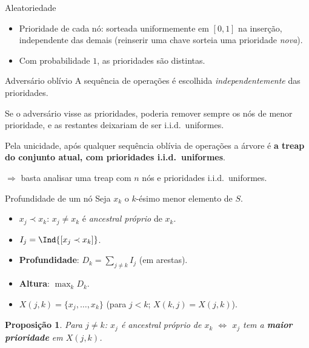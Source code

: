 \documentclass[aspectratio=169,11pt]{beamer}
\newtheorem{proposicao}[theorem]{Proposição}
\theoremstyle{definition}
\begin{document}
\begin{frame}{Aleatoriedade}
  \begin{itemize}
  \item Prioridade de cada nó: sorteada uniformemente em $[0,1]$ na
    inserção, independente das demais (reinserir uma chave sorteia
    uma prioridade \emph{nova}).
  \item Com probabilidade $1$, as prioridades são distintas.
  \end{itemize}
  \pause
  \begin{alertblock}{Adversário oblívio}
    A sequência de operações é escolhida \emph{independentemente} das
    prioridades.

    Se o adversário visse as prioridades, poderia remover sempre os nós
    de menor prioridade, e as restantes deixariam de ser i.i.d.\
    uniformes.
  \end{alertblock}
  \pause
  Pela unicidade, após qualquer sequência oblívia de operações a
  árvore é \textbf{a treap do conjunto atual, com prioridades i.i.d.\
    uniformes}.

  $\Rightarrow$ basta analisar uma treap com $n$ nós e prioridades
  i.i.d.\ uniformes.
\end{frame}

\begin{frame}{Profundidade de um nó}
  Seja $x_k$ o $k$-ésimo menor elemento de $S$.
  \begin{itemize}
  \item $x_j\prec x_k$: $x_j\neq x_k$ é \emph{ancestral próprio} de
    $x_k$.
  \item $I_j=\Ind{[x_j\prec x_k]}$.
  \item \textbf{Profundidade}: $D_k=\sum_{j\neq k}I_j$ (em arestas).
  \item \textbf{Altura}: $\max_k D_k$.
  \item $X(j,k)=\{x_j,\dots,x_k\}$ (para $j<k$; $X(k,j)=X(j,k)$).
  \end{itemize}
  \pause
  \begin{proposicao}
    Para $j\neq k$: $x_j$ é ancestral próprio de $x_k$ $\iff$ $x_j$
    tem a \textbf{maior prioridade} em $X(j,k)$.
  \end{proposicao}
\end{frame}
\end{document}
